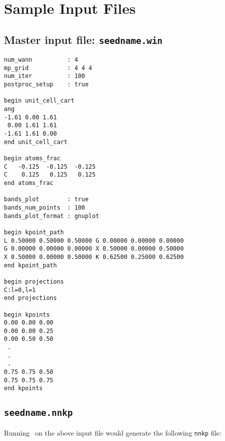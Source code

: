 \chapter{Sample Input Files}\label{chap:files}

\section{Master input file: {\tt seedname.win}}\label{winfile}

\begin{verbatim}
num_wann          : 4 
mp_grid           : 4 4 4 
num_iter          : 100
postproc_setup    : true

begin unit_cell_cart
ang
-1.61 0.00 1.61
 0.00 1.61 1.61
-1.61 1.61 0.00
end unit_cell_cart

begin atoms_frac
C   -0.125  -0.125  -0.125
C    0.125   0.125   0.125
end atoms_frac

bands_plot        : true
bands_num_points  : 100
bands_plot_format : gnuplot

begin kpoint_path
L 0.50000 0.50000 0.50000 G 0.00000 0.00000 0.00000
G 0.00000 0.00000 0.00000 X 0.50000 0.00000 0.50000
X 0.50000 0.00000 0.50000 K 0.62500 0.25000 0.62500
end kpoint_path

begin projections
C:l=0,l=1
end projections

begin kpoints
0.00 0.00 0.00
0.00 0.00 0.25
0.00 0.50 0.50
 .
 .
 .
0.75 0.75 0.50
0.75 0.75 0.75
end kpoints

\end{verbatim}

\section{{\tt seedname.nnkp}}\label{nnkp-file}
Running \wannier\ on the above input file would generate the
following \verb#nnkp# file: 

